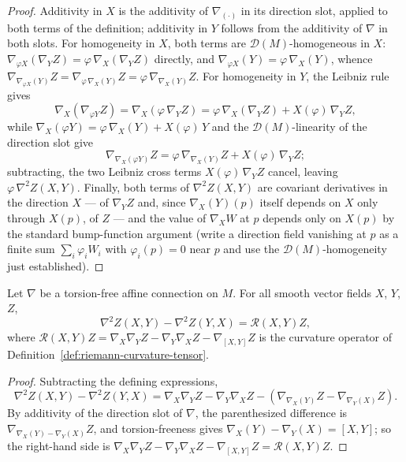 \begin{proof}
\leanok
Additivity in $X$ is the additivity of $\nabla_{(\cdot)}$ in its
direction slot, applied to both terms of the definition; additivity
in $Y$ follows from the additivity of $\nabla$ in both slots. For
homogeneity in $X$, both terms are $\mathcal{D}(M)$-homogeneous in
$X$: $\nabla_{\varphi X}(\nabla_YZ)=\varphi\,\nabla_X(\nabla_YZ)$
directly, and $\nabla_{\varphi X}(Y)=\varphi\,\nabla_X(Y)$, whence
$\nabla_{\nabla_{\varphi X}(Y)}Z
=\nabla_{\varphi\,\nabla_X(Y)}Z=\varphi\,\nabla_{\nabla_X(Y)}Z$. For
homogeneity in $Y$, the Leibniz rule gives
$$\nabla_X\left(\nabla_{\varphi Y}Z\right)
=\nabla_X\left(\varphi\,\nabla_YZ\right)
=\varphi\,\nabla_X\left(\nabla_YZ\right)+X(\varphi)\,\nabla_YZ,$$
while $\nabla_X(\varphi Y)=\varphi\,\nabla_X(Y)+X(\varphi)\,Y$ and
the $\mathcal{D}(M)$-linearity of the direction slot give
$$\nabla_{\nabla_X(\varphi Y)}Z
=\varphi\,\nabla_{\nabla_X(Y)}Z+X(\varphi)\,\nabla_YZ;$$
subtracting, the two Leibniz cross terms $X(\varphi)\,\nabla_YZ$
cancel, leaving $\varphi\,\nabla^2Z(X,Y)$. Finally, both terms of
$\nabla^2Z(X,Y)$ are covariant derivatives in the direction $X$ — of
$\nabla_YZ$ and, since $\nabla_X(Y)(p)$ itself depends on $X$ only
through $X(p)$, of $Z$ — and the value of $\nabla_XW$ at $p$ depends
only on $X(p)$ by the standard bump-function argument (write a
direction field vanishing at $p$ as a finite sum
$\sum_i\varphi_iW_i$ with $\varphi_i(p)=0$ near $p$ and use the
$\mathcal{D}(M)$-homogeneity just established).
\end{proof}

\begin{lemma}
\label{lem:ricci-commutation-vector-field}
\leanok
Let $\nabla$ be a torsion-free affine connection on $M$. For all
smooth vector fields $X$, $Y$, $Z$,
$$\nabla^2Z(X,Y)-\nabla^2Z(Y,X)={\mathcal R}(X,Y)Z,$$
where ${\mathcal R}(X,Y)Z
=\nabla_X\nabla_YZ-\nabla_Y\nabla_XZ-\nabla_{[X,Y]}Z$ is the
curvature operator of Definition~\ref{def:riemann-curvature-tensor}.
\end{lemma}

\begin{proof}
\leanok
Subtracting the defining expressions,
$$\nabla^2Z(X,Y)-\nabla^2Z(Y,X)
=\nabla_X\nabla_YZ-\nabla_Y\nabla_XZ
-\left(\nabla_{\nabla_X(Y)}Z-\nabla_{\nabla_Y(X)}Z\right).$$
By additivity of the direction slot of $\nabla$, the parenthesized
difference is $\nabla_{\nabla_X(Y)-\nabla_Y(X)}Z$, and
torsion-freeness gives $\nabla_X(Y)-\nabla_Y(X)=[X,Y]$; so the
right-hand side is
$\nabla_X\nabla_YZ-\nabla_Y\nabla_XZ-\nabla_{[X,Y]}Z
={\mathcal R}(X,Y)Z$.
\end{proof}

